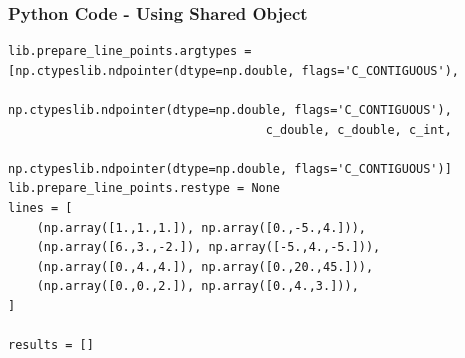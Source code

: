 \documentclass{beamer}
\numberwithin{equation}{section}
\begin{document}
\begin{frame}[fragile]
    \frametitle{Python Code - Using Shared Object}
    \begin{lstlisting}
lib.prepare_line_points.argtypes = [np.ctypeslib.ndpointer(dtype=np.double, flags='C_CONTIGUOUS'),
                                    np.ctypeslib.ndpointer(dtype=np.double, flags='C_CONTIGUOUS'),
                                    c_double, c_double, c_int,
                                    np.ctypeslib.ndpointer(dtype=np.double, flags='C_CONTIGUOUS')]
lib.prepare_line_points.restype = None 
lines = [
    (np.array([1.,1.,1.]), np.array([0.,-5.,4.])),
    (np.array([6.,3.,-2.]), np.array([-5.,4.,-5.])),
    (np.array([0.,4.,4.]), np.array([0.,20.,45.])),
    (np.array([0.,0.,2.]), np.array([0.,4.,3.])),
]

results = []
\end{lstlisting}
\end{frame}
\end{document}
